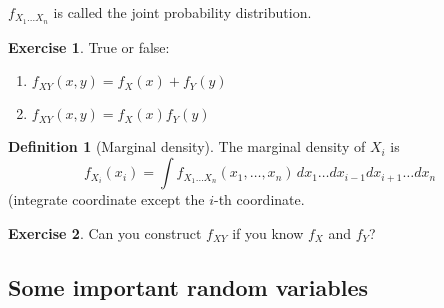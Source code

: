 \documentclass[
  openany]{book}
\theoremstyle{definition}
\newtheorem{definition}{Definition}[chapter]
\theoremstyle{definition}
\theoremstyle{definition}
\newtheorem{exercise}{Exercise}[chapter]
\theoremstyle{definition}
\theoremstyle{remark}
\begin{document}
\(f_{X_1\dots X_n}\) is called the joint probability distribution.

\begin{exercise}

True or false:

\begin{enumerate}
\def\labelenumi{\arabic{enumi}.}
\item
  \(f_{XY}(x,y) = f_{X}(x) + f_{Y}(y)\)
\item
  \(f_{XY}(x,y) = f_{X}(x) f_{Y}(y)\)
\end{enumerate}

\end{exercise}

\begin{definition}[Marginal density]
The marginal density of \(X_i\) is
\[f_{X_i}(x_i) = \int f_{X_1\dots X_n}(x_1, \dots, x_n) \, dx_1\dots dx_{i-1} dx_{i+1} \dots dx_n\]
(integrate coordinate except the \(i\)-th coordinate.
\end{definition}

\begin{exercise}
Can you construct \(f_{XY}\) if you know \(f_X\) and \(f_Y\)?
\end{exercise}

\subsection{Some important random variables}\label{some-important-random-variables}
\end{document}
